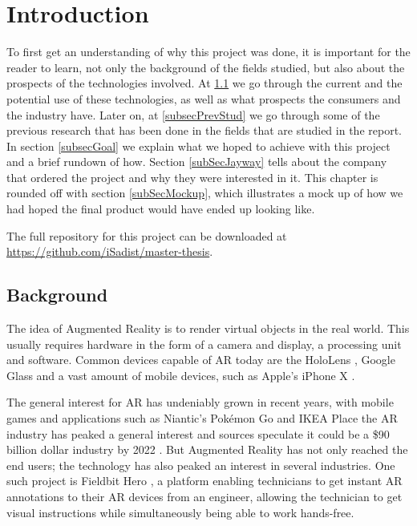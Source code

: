 \chapter{Introduction}
To first get an understanding of why this project was done, it is important for the reader to learn, not only the background of the fields studied, but also about the prospects of the technologies involved.
 At \ref{subsecBackground} we go through the current and the potential use of these technologies, as well as what prospects the consumers and the industry have. Later on, at  \ref{subsecPrevStud} we go through some of the previous research that has been done in the fields that are studied in the report. In section \ref{subsecGoal} we explain what we hoped to achieve with this project and a brief rundown of how. Section \ref{subSecJayway} tells about the company that ordered the project and why they were interested in it. This chapter is rounded off with section \ref{subSecMockup}, which illustrates a mock up of how we had hoped the final product would have ended up looking like.
 
 The full repository for this project can be downloaded at \url{https://github.com/iSadist/master-thesis}.

\section{Background}
\label{subsecBackground}
The idea of Augmented Reality is to render virtual objects in the real world. This usually 
requires hardware in the form of a camera and display, a processing unit and software. 
Common devices capable of AR today are the HoloLens \cite{microsoft}, Google Glass 
\cite{googleGlasses} and a vast amount of mobile devices, such as Apple's iPhone X 
\cite{appleAR}. 

The general interest for AR has undeniably grown in recent years, with mobile games and 
applications such as Niantic's Pokémon Go \cite{pokemonGO} and IKEA Place 
\cite{IKEAPlace} the AR industry has peaked a general interest and sources speculate it 
could be a \$90 billion dollar industry by 2022 \cite{digi-capital}.
But Augmented Reality has not only reached the end users; the technology has also 
peaked an interest in several industries. One such project is Fieldbit Hero 
\cite{fieldbit}, a platform enabling technicians to get instant AR annotations to their AR 
devices from an engineer, allowing the technician to get visual instructions while 
simultaneously  being able to work hands-free. 
 
